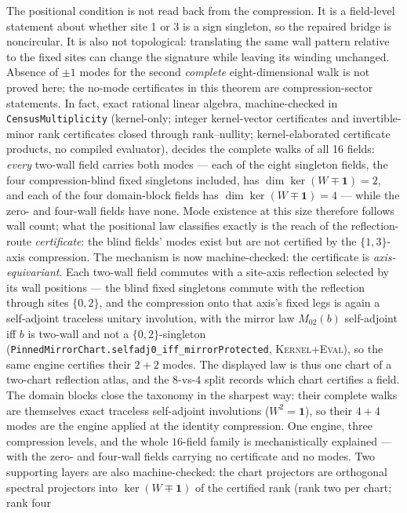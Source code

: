 \documentclass[11pt]{article}
\newcommand{\id}{\mathbf{1}}
\newcommand{\DraftTrust}{\textcolor{draftcolor}{\textsc{Kernel+Eval}}}
\begin{document}
The positional condition is not read back from the compression.  It is a
field-level statement about whether site 1 or 3 is a sign singleton, so the
repaired bridge is noncircular.  It is also not topological: translating the
same wall pattern relative to the fixed sites can change the signature while
leaving its winding unchanged.  Absence of $\pm1$ modes for the second
\emph{complete} eight-dimensional walk is not proved here; the no-mode
certificates in this theorem are compression-sector statements.  In fact,
exact rational linear algebra, machine-checked in
\texttt{CensusMultiplicity} (kernel-only; integer kernel-vector certificates and
invertible-minor rank certificates closed through rank--nullity;
kernel-elaborated certificate products, no compiled evaluator),
decides the
complete walks of all 16 fields: \emph{every} two-wall field carries both
modes --- each of the eight singleton fields, the four compression-blind
fixed singletons included, has $\dim\ker(W\mp\id)=2$, and each of the four
domain-block fields has $\dim\ker(W\mp\id)=4$ --- while the zero- and
four-wall fields have none.  Mode existence at this size therefore follows wall
count; what the positional law classifies exactly is the reach of the
reflection-route \emph{certificate}: the blind fields' modes exist but are
not certified by the $\{1,3\}$-axis compression.  The mechanism is now
machine-checked: the certificate is \emph{axis-equivariant}.  Each
two-wall field commutes with a site-axis reflection selected by its wall
positions --- the blind fixed singletons commute with the reflection
through sites $\{0,2\}$, and the compression onto that axis's fixed legs
is again a self-adjoint traceless unitary involution, with the mirror law
$M_{02}(b)$ self-adjoint iff $b$ is two-wall and not a $\{0,2\}$-singleton
(\texttt{PinnedMirrorChart.selfadj0\_iff\_mirrorProtected},
\DraftTrust{}), so the same engine certifies their $2+2$ modes.  The
displayed law is thus one chart of a two-chart reflection atlas, and the
$8$-vs-$4$ split records which chart certifies a field.  The domain
blocks close the taxonomy in the sharpest way: their complete walks are
themselves exact traceless self-adjoint involutions ($W^2=\id$), so their
$4+4$ modes are the engine applied at the identity compression.  One
engine, three compression levels, and the whole $16$-field family is
mechanistically explained --- with the zero- and four-wall fields
carrying no certificate and no modes.  Two supporting layers are also
machine-checked: the chart projectors are orthogonal spectral projectors
into $\ker(W\mp\id)$ of the certified rank (rank two per chart; rank four
\end{document}
